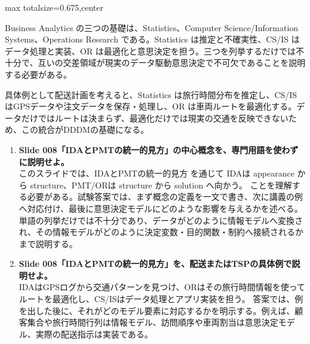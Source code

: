 \begin{adjustbox}{max totalsize={\textwidth}{0.675\textheight},center}
\begin{minipage}{\textwidth}
\begin{minipage}[t]{0.485\textwidth}
Business Analytics の三つの基礎は、Statistics、Computer Science/Information Systems、Operations Research である。Statistics は推定と不確実性、CS/IS はデータ処理と実装、OR は最適化と意思決定を担う。三つを列挙するだけでは不十分で、互いの交差領域が現実のデータ駆動意思決定で不可欠であることを説明する必要がある。\par
具体例として配送計画を考えると、Statistics は旅行時間分布を推定し、CS/IS はGPSデータや注文データを保存・処理し、OR は車両ルートを最適化する。データだけではルートは決まらず、最適化だけでは現実の交通を反映できないため、この統合がDDDMの基礎になる。\par
{}
\begin{enumerate}
\item \textbf{Slide 008「IDAとPMTの統一的見方」の中心概念を、専門用語を使わずに説明せよ。}\\このスライドでは、IDAとPMTの統一的見方 を通じて IDAは appearance から structure、PMT/ORは structure から solution へ向かう。 ことを理解する必要がある。試験答案では、まず概念の定義を一文で書き、次に講義の例へ対応付け、最後に意思決定モデルにどのような影響を与えるかを述べる。単語の列挙だけでは不十分であり、データがどのように情報モデルへ変換され、その情報モデルがどのように決定変数・目的関数・制約へ接続されるかまで説明する。
\item \textbf{Slide 008「IDAとPMTの統一的見方」を、配送またはTSPの具体例で説明せよ。}\\IDAはGPSログから交通パターンを見つけ、ORはその旅行時間情報を使ってルートを最適化し、CS/ISはデータ処理とアプリ実装を担う。 答案では、例を出した後に、それがどのモデル要素に対応するかを明示する。例えば、顧客集合や旅行時間行列は情報モデル、訪問順序や車両割当は意思決定モデル、実際の配送指示は実装である。
\end{enumerate}
\end{minipage}
\end{minipage}
\end{adjustbox}

